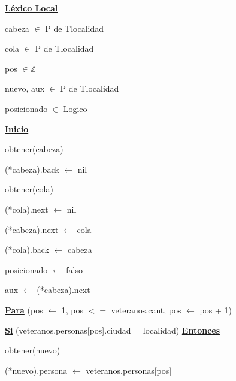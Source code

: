 \documentclass{article}
\begin{document}
        \hspace{8mm}\underline{\textbf{Léxico Local}}

            \hspace{12mm}cabeza $\in$ P de Tlocalidad

            \hspace{12mm}cola $\in$ P de Tlocalidad

            \hspace{12mm}pos $\in \mathbb{Z}$

            \hspace{12mm}nuevo, aux $\in$ P de Tlocalidad

            \hspace{12mm}posicionado $\in$ Logico

        \hspace{8mm}\underline{\textbf{Inicio}}

            \hspace{12mm}obtener(cabeza)

            \hspace{12mm}(*cabeza).back $\leftarrow$ nil

            \hspace{12mm}obtener(cola)

            \hspace{12mm}(*cola).next $\leftarrow$ nil

            \hspace{12mm}(*cabeza).next $\leftarrow$ cola

            \hspace{12mm}(*cola).back $\leftarrow$ cabeza

            \hspace{12mm}posicionado $\leftarrow$ falso

            \hspace{12mm}aux $\leftarrow$ (*cabeza).next

            \hspace{12mm}\underline{\textbf{Para}} (pos $\leftarrow$ 1, pos $<=$ veteranos.cant, pos $\leftarrow$ pos + 1)

            \hspace{16mm}\underline{\textbf{Si}} (veteranos.personas[pos].ciudad = localidad) \underline{\textbf{Entonces}}

                \hspace{20mm}obtener(nuevo)

                \hspace{20mm}(*nuevo).persona $\leftarrow$ veteranos.personas[pos]
\end{document}
